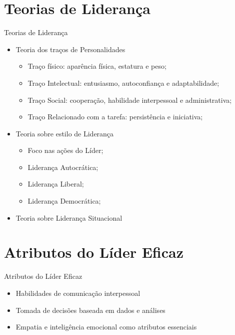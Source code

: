\documentclass[aspectratio=169,xcolor=dvipsnames]{beamer}
\begin{document}
\section{Teorias de Liderança}

\begin{frame}{Teorias de Liderança}
	\begin{itemize}
		\item Teoria dos traços de Personalidades
		      \begin{itemize}
			      \item Traço físico: aparência física, estatura e peso;
			      \item Traço Intelectual: entusiasmo, autoconfiança e adaptabilidade;
			      \item Traço Social: cooperação, habilidade interpessoal e administrativa;
			      \item Traço Relacionado com a tarefa: persistência e iniciativa;
		      \end{itemize}
		\item Teoria sobre estilo de Liderança
		      \begin{itemize}
			      \item Foco nas ações do Líder;
			      \item Liderança Autocrática;
			      \item Liderança Liberal;
			      \item Liderança Democrática;
		      \end{itemize}
		\item Teoria sobre Liderança Situacional
	\end{itemize}
\end{frame}

\section{Atributos do Líder Eficaz}

\begin{frame}{Atributos do Líder Eficaz}
	\begin{itemize}
		\item Habilidades de comunicação interpessoal
		\item Tomada de decisões baseada em dados e análises
		\item Empatia e inteligência emocional como atributos essenciais

	\end{itemize}
\end{frame}
\end{document}
